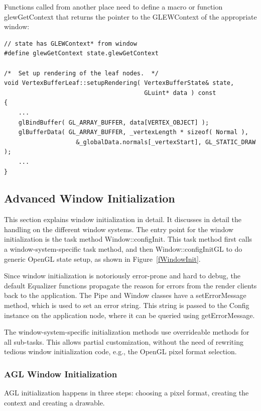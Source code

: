 \documentclass[10pt,a4]{scrartcl}
\newcommand{\fig}[1]{Figure~\ref{#1}}
\begin{document}
Functions called from another place need to define a macro or function
\textsf{glewGetContext} that returns the pointer to the GLEWContext of
the appropriate window:

{\footnotesize\begin{lstlisting}
// state has GLEWContext* from window
#define glewGetContext state.glewGetContext

/*  Set up rendering of the leaf nodes.  */
void VertexBufferLeaf::setupRendering( VertexBufferState& state,
                                       GLuint* data ) const
{
    ...
    glBindBuffer( GL_ARRAY_BUFFER, data[VERTEX_OBJECT] );
    glBufferData( GL_ARRAY_BUFFER, _vertexLength * sizeof( Normal ),
                    &_globalData.normals[_vertexStart], GL_STATIC_DRAW );
    ...
}
\end{lstlisting}}


\subsection{Advanced Window Initialization}

This section explains window initialization in detail. It discusses in
detail the handling on the different window systems. The entry point for
the window initialization is the task method
\textsf{Window::configInit}. This task method first calls a
window-system-specific task method, and then
\textsf{Window::configInitGL} to do generic OpenGL state setup, as shown
in \fig{fWindowInit}.

Since window initialization is notoriously error-prone and hard to
debug, the default Equalizer functions propagate the reason for errors
from the render clients back to the application. The \textsf{Pipe} and
\textsf{Window} classes have a \textsf{setErrorMessage} method, which is
used to set an error string. This string is passed to the
\textsf{Config} instance on the application node, where it can be
queried using \textsf{getErrorMessage}.

The window-system-specific initialization methods use overrideable
methods for all sub-tasks. This allows partial customization, without
the need of rewriting tedious window initialization code, e.g., the
OpenGL pixel format selection.

\subsubsection{AGL Window Initialization}

AGL initialization happens in three steps: choosing a pixel format,
creating the context and creating a drawable. 
\end{document}
